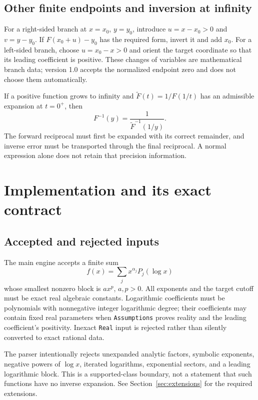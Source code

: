 \documentclass[11pt,a4paper]{article}
\numberwithin{equation}{section}
\theoremstyle{definition}
\theoremstyle{remark}
\begin{document}
\subsection{Other finite endpoints and inversion at infinity}

For a right-sided branch at $x=x_0$, $y=y_0$, introduce $u=x-x_0>0$ and
$v=y-y_0$. If $F(x_0+u)-y_0$ has the required form, invert it and add $x_0$.
For a left-sided branch, choose $u=x_0-x>0$ and orient the target coordinate
so that its leading coefficient is positive. These changes of variables
are mathematical branch data; version 1.0 accepts the normalized endpoint
zero and does not choose them automatically.

If a positive function grows to infinity and
$\widetilde F(t)=1/F(1/t)$ has an admissible expansion at $t=0^+$, then
\[
 F^{-1}(y)=\frac1{\widetilde F^{-1}(1/y)}.
\]
The forward reciprocal must first be expanded with its correct remainder,
and inverse error must be transported through the final reciprocal.
A normal expression alone does not retain that precision information.

\section{Implementation and its exact contract}
\label{sec:implementation}

\subsection{Accepted and rejected inputs}

The main engine accepts a finite sum
\[
 f(x)=\sum_j x^{\alpha_j}P_j(\log x)
\]
whose smallest nonzero block is $a x^p$, $a,p>0$.
All exponents and the target cutoff must be exact real algebraic constants.
Logarithmic coefficients must be polynomials with nonnegative integer
logarithmic degree; their coefficients may contain fixed real parameters
when \texttt{Assumptions} proves reality and the leading coefficient's
positivity. Inexact \texttt{Real} input is rejected rather than silently
converted to exact rational data.

The parser intentionally rejects unexpanded analytic factors, symbolic
exponents, negative powers of $\log x$, iterated logarithms, exponential
sectors, and a leading logarithmic block. This is a supported-class boundary,
not a statement that such functions have no inverse expansion. See
Section~\ref{sec:extensions} for the required extensions.
\end{document}

